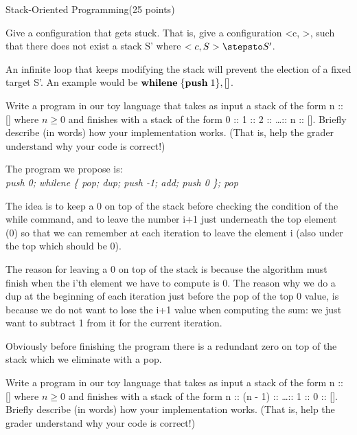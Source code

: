 \documentclass{article}
\begin{document}
\begin{question}{Stack-Oriented Programming}{(25 points)}
\begin{subquestion}
  \end{subquestion}

  \begin{subquestion}
     Give a configuration that gets stuck. That is, give a configuration <c, \stack>, such that there does not exist a stack S' where $<c, S> \stepsto S'$.
     
     An infinite loop that keeps modifying the stack will prevent the election of a fixed target S'. An example would be $\mathbf{whilene}\;\{\mathbf{push}\;1\}, []$.
    
  \end{subquestion}
  
  \begin{subquestion}
 Write a program in our toy language that takes as input a stack of the form n :: [] where $n \geq 0$ and
finishes with a stack of the form 0 :: 1 :: 2 :: \dots :: n :: []. Briefly describe (in words) how your
implementation works. (That is, help the grader understand why your code is correct!)

The program we propose is:\\
 \emph{push 0; whilene \{ pop; dup; push -1; add; push 0 \}; pop}
 
 The idea is to keep a 0 on top of the stack before checking the condition of the while command, and to leave the number i+1 just underneath the top element (0) so that we can remember at each iteration to leave the element i (also under the top which should be 0).
 
 The reason for leaving a 0 on top of the stack is because the algorithm must finish when the i'th element we have to compute is 0. The reason why we do a dup at the beginning of each iteration just before the pop of the top 0 value, is because we do not want to lose the i+1 value when computing the sum: we just want to subtract 1 from it for the current iteration.
 
 Obviously before finishing the program there is a redundant zero on top of the stack which we eliminate with a pop. 


  \end{subquestion}
  
  \begin{subquestion}
    Write a program in our toy language that takes as input a stack of the form n :: [] where $n \geq 0$ and
   finishes with a stack of the form n :: (n - 1) :: \dots :: 1 :: 0 :: []. Briefly describe (in words) how your
   implementation works. (That is, help the grader understand why your code is correct!)
   

\end{subquestion}
\end{question}
\end{document}
